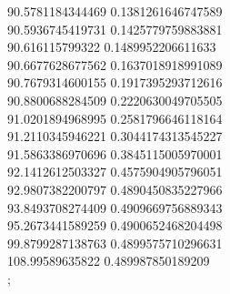 {90.5781184344469 0.1381261646747589 \\
90.5936745419731 0.1425779759883881 \\
90.616115799322 0.1489952206611633 \\
90.6677628677562 0.1637018918991089 \\
90.7679314600155 0.1917395293712616 \\
90.8800688284509 0.2220630049705505 \\
91.0201894968995 0.2581796646118164 \\
91.2110345946221 0.3044174313545227 \\
91.5863386970696 0.3845115005970001 \\
92.1412612503327 0.4575904905796051 \\
92.9807382200797 0.4890450835227966 \\
93.8493708274409 0.4909669756889343 \\
95.2673441589259 0.4900652468204498 \\
99.8799287138763 0.4899575710296631 \\
108.99589635822 0.489987850189209 \\
};
